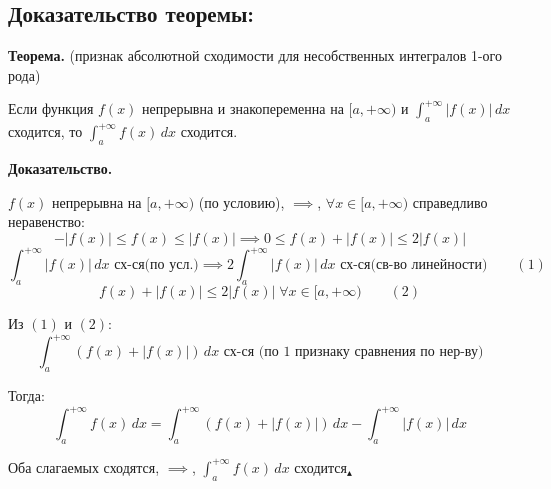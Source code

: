 \documentclass[11pt]{article}
\begin{document}
\subsection*{Доказательство теоремы:}
\par\textbf{Теорема.} (признак абсолютной сходимости для несобственных интегралов 1-ого рода)
\par Если функция $f(x)$ непрерывна и знакопеременна на $[a, +\infty)$ и $\int_{a}^{+\infty} |f(x)| \, dx$ сходится, то $\int_{a}^{+\infty} f(x) \, dx$ сходится.
\par\textbf{Доказательство.}
\par $f(x)$ непрерывна на $[a, +\infty)$ (по условию), $\implies$, $\forall x \in [a, +\infty)$ справедливо неравенство: $$-|f(x)| \leq f(x) \leq |f(x)| \implies 0 \leq f(x) + |f(x)| \leq 2 |f(x)|$$
$$\int_{a}^{+\infty} |f(x)| \, dx \text{ сх-ся(по усл.)} \implies 2\int_{a}^{+\infty} |f(x)| \, dx \text{ сх-ся(св-во линейности)} \qquad (1)$$
$$f(x) + |f(x)| \leq 2 |f(x)| \; \forall x \in [a, +\infty) \qquad (2)$$
\par Из $(1)$ и $(2)$: $$\int_{a}^{+\infty} (f(x) + |f(x)|) \, dx \text{ сх-ся (по 1 признаку сравнения по нер-ву)}$$
\par Тогда:$$\int_{a}^{+\infty} f(x) \, dx = \int_{a}^{+\infty} (f(x) + |f(x)|) \, dx - \int_{a}^{+\infty} |f(x)| \, dx$$
\par Оба слагаемых сходятся, $\implies$, $\int_{a}^{+\infty} f(x) \, dx$ сходится$_{\blacktriangle}$
\end{document}
